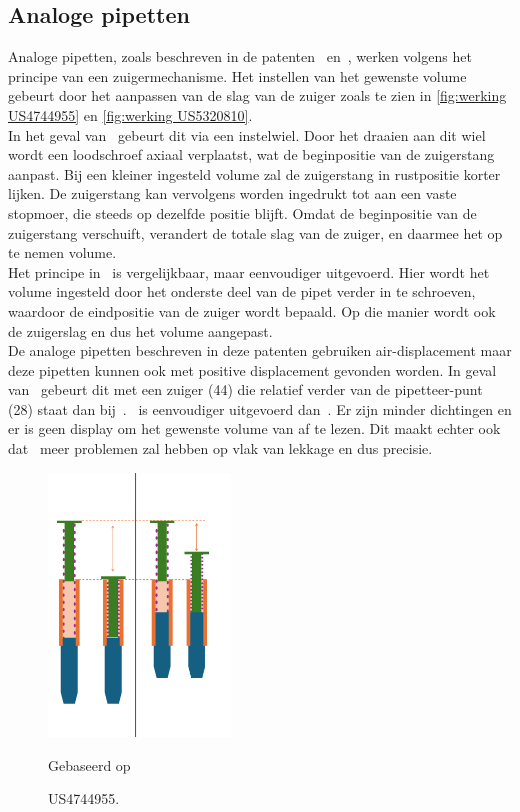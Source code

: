 \subsection{Analoge pipetten}\label{sec: Analoge pipetten}
Analoge pipetten, zoals beschreven in de patenten\ \cite{RN16} en\ \cite{RN17}, werken volgens het principe van een zuigermechanisme. Het instellen van het gewenste volume gebeurt door het aanpassen van de slag van de zuiger zoals te zien in \autoref{fig:werking US4744955} en \autoref{fig:werking US5320810}.
\\[12pt]In het geval van\ \cite{RN17} gebeurt dit via een instelwiel. Door het draaien aan dit wiel wordt een loodschroef axiaal verplaatst, wat de beginpositie van de zuigerstang aanpast. Bij een kleiner ingesteld volume zal de zuigerstang in rustpositie korter lijken. De zuigerstang kan vervolgens worden ingedrukt tot aan een vaste stopmoer, die steeds op dezelfde positie blijft. Omdat de beginpositie van de zuigerstang verschuift, verandert de totale slag van de zuiger, en daarmee het op te nemen volume.
\\[12pt]Het principe in\ \cite{RN16} is vergelijkbaar, maar eenvoudiger uitgevoerd. Hier wordt het volume ingesteld door het onderste deel van de pipet verder in te schroeven, waardoor de eindpositie van de zuiger wordt bepaald. Op die manier wordt ook de zuigerslag en dus het volume aangepast.
\\[12pt]De analoge pipetten beschreven in deze patenten gebruiken air-displacement maar deze pipetten kunnen ook met positive displacement gevonden worden. In geval van\ \cite{RN17} gebeurt dit met een zuiger (44) die relatief verder van de pipetteer-punt (28) staat dan bij\ \cite{RN16}.\ \cite{RN16} is eenvoudiger uitgevoerd dan\ \cite{RN17}. Er zijn minder dichtingen en er is geen display om het gewenste volume van af te lezen. Dit maakt echter ook dat\ \cite{RN16} meer problemen zal hebben op vlak van lekkage en dus precisie.
\\[12pt]\begin{minipage}[t]{0.49\textwidth}
    \vspace{0pt}
    \begin{figure}[H]
        \centering
        \includegraphics[height=7cm]{figures/Werking US4744955.png}
        \caption{US4744955.}\label{fig:werking US4744955}
        Gebaseerd op\ \cite{RN16}
    \end{figure}
\end{minipage}
